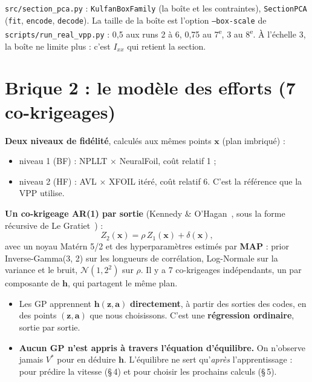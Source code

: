 \documentclass[11pt,a4paper]{article}
\newcommand{\vx}{\bm{x}}
\newcommand{\vz}{\bm{z}}
\newcommand{\va}{\bm{a}}
\newcommand{\vh}{\bm{h}}
\newcommand{\py}[1]{\texttt{#1}}
\begin{document}
\begin{danslecode}
\py{src/section\_pca.py} : \py{KulfanBoxFamily} (la boîte et les contraintes), \py{SectionPCA} (\py{fit},
\py{encode}, \py{decode}). La taille de la boîte est l'option \py{--box-scale} de
\py{scripts/run\_real\_vpp.py} : 0,5 aux runs 2 à 6, 0,75 au 7\textsuperscript{e}, 3 au 8\textsuperscript{e}.
À l'échelle 3, la boîte ne limite plus : c'est $I_{xx}$ qui retient la section.
\end{danslecode}

\section{Brique 2 : le modèle des efforts (7 co-krigeages)}
\textbf{Deux niveaux de fidélité}, calculés aux mêmes points $\vx$ (plan imbriqué) :
\begin{itemize}
  \item niveau 1 (BF) : NPLLT × NeuralFoil, coût relatif 1 ;
  \item niveau 2 (HF) : AVL × XFOIL itéré, coût relatif 6. C'est la référence que la VPP utilise.
\end{itemize}

\textbf{Un co-krigeage AR(1) par sortie} (Kennedy \& O'Hagan~\cite{KOH00}, sous la forme récursive de Le
Gratiet~\cite{LG}) :
\[
Z_2(\vx)=\rho\,Z_1(\vx)+\delta(\vx),
\]
avec un noyau Matérn 5/2 et des hyperparamètres estimés par \textbf{MAP} : prior Inverse-Gamma(3, 2) sur les
longueurs de corrélation, Log-Normale sur la variance et le bruit, $\mathcal N(1,2^2)$ sur $\rho$. Il y a 7
co-krigeages indépendants, un par composante de $\vh$, qui partagent le même plan.

\begin{aretenir}
\begin{itemize}
  \item Les GP apprennent $\vh(\vz,\va)$ \textbf{directement}, à partir des sorties des codes, en des points
        $(\vz,\va)$ que nous choisissons. C'est une \textbf{régression ordinaire}, sortie par sortie.
  \item \textbf{Aucun GP n'est appris à travers l'équation d'équilibre.} On n'observe jamais $V^\ast$ pour en
        déduire $\vh$. L'équilibre ne sert qu'\emph{après} l'apprentissage : pour prédire la vitesse (§\,4) et
        pour choisir les prochains calculs (§\,5).
\end{itemize}
\end{aretenir}
\end{document}
